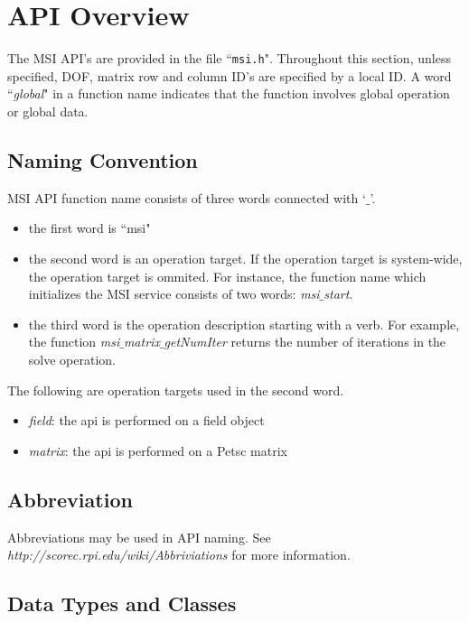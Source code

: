 \section{API Overview}
The MSI API's are provided in the file ``\texttt{msi.h}". Throughout this section, unless specified, DOF, matrix row and column ID's are specified by a local ID. A word ``\emph{global}" in a function name indicates that the function involves global operation or global data.

\subsection{Naming Convention}

MSI API function name consists of three words connected with `$\_$'.

\begin{itemize}
\item the first word is ``msi"
\item the second word is an operation target. If the operation target is system-wide, the operation target is ommited. For instance, the function name which initializes the MSI service consists of two words: \emph{msi}$\_$\emph{start}.
\item the third word is the operation description starting with a verb. For example, the function \emph{msi}$\_$\emph{matrix}$\_$\emph{getNumIter} returns the number of iterations in the solve operation. 
\end{itemize}

The following are operation targets used in the second word.

\begin{itemize}
\item \textit{field}: the api is performed on a field object
\item \textit{matrix}: the api is performed on a Petsc matrix
\end{itemize}

\subsection{Abbreviation}

Abbreviations may be used in API naming. See \textit{http://scorec.rpi.edu/wiki/Abbriviations} for more information.
 
\subsection{Data Types and Classes}

